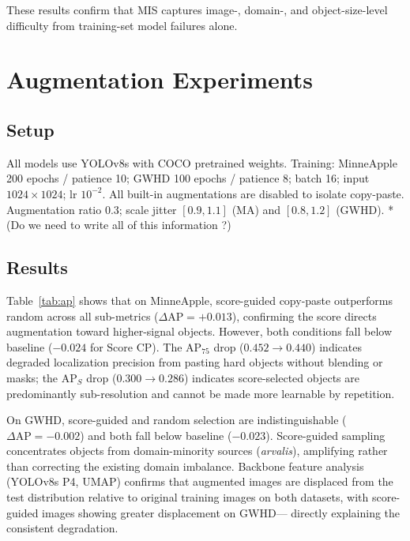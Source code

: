 \documentclass[conference]{IEEEtran}
\begin{document}
These results confirm that MIS captures
image-, domain-, and object-size-level difficulty from training-set
model failures alone.

\section{Augmentation Experiments}

\subsection{Setup}

All models use YOLOv8s with COCO pretrained weights.
%
%
Training: MinneApple 200 epochs / patience 10; GWHD 100 epochs /
patience 8; batch 16; input $1024{\times}1024$; lr $10^{-2}$.
All built-in augmentations are disabled to isolate copy-paste.
Augmentation ratio 0.3; scale jitter $[0.9,1.1]$ (MA) and
$[0.8,1.2]$ (GWHD). 
*(Do we need to write all of this information ?)

\subsection{Results}

Table~\ref{tab:ap} shows that on MinneApple, score-guided copy-paste
outperforms random across all sub-metrics ($\Delta\mathrm{AP}
{=}{+}0.013$), confirming the score directs augmentation toward
higher-signal objects. However, both conditions fall below baseline
($-0.024$ for Score CP). The AP$_{75}$ drop ($0.452{\to}0.440$)
indicates degraded localization precision from pasting hard objects
without blending or masks; the AP$_S$ drop ($0.300{\to}0.286$)
indicates score-selected objects are predominantly sub-resolution
and cannot be made more learnable by repetition.

On GWHD, score-guided and random selection are indistinguishable
($\Delta\mathrm{AP}{=}-0.002$) and both fall below baseline ($-0.023$).
Score-guided sampling concentrates objects from domain-minority
sources (\textit{arvalis}), amplifying rather than correcting the
existing domain imbalance. Backbone feature analysis (YOLOv8s P4,
UMAP) confirms that augmented images are displaced from the test
distribution relative to original training images on both datasets,
with score-guided images showing greater displacement on GWHD---
directly explaining the consistent degradation.
\end{document}

